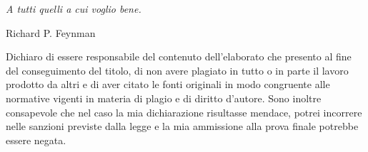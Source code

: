 \thispagestyle{empty}

\vspace*{6cm}
\begin{flushright}
	\textit{A tutti quelli a cui voglio bene.}\\
\end{flushright}
\vspace{.5cm}
\begin{flushright}
	\textit{}
	
	\textemdash{} Richard P. Feynman
\end{flushright}
\vfill
\vfill
\begin{center}
	\small
	Dichiaro di essere responsabile del contenuto dell'elaborato che
	presento al fine del conseguimento del titolo, di non avere plagiato in
	tutto o in parte il lavoro prodotto da altri e di aver citato le fonti
	originali in modo congruente alle normative vigenti in materia di plagio
	e di diritto d'autore. Sono inoltre consapevole che nel caso la mia
	dichiarazione risultasse mendace, potrei incorrere nelle sanzioni
	previste dalla legge e la mia ammissione alla prova finale potrebbe
	essere negata.
\end{center}